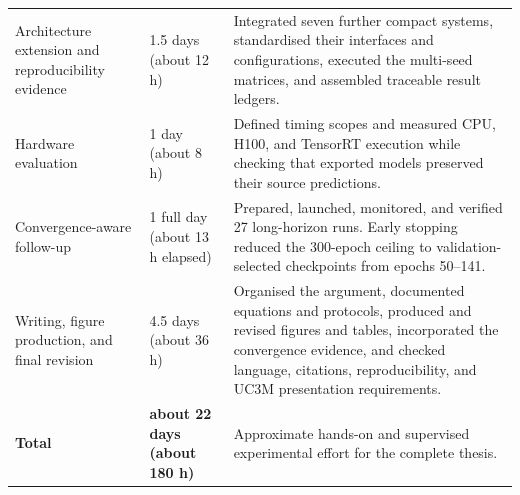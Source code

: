 \begin{longtable}{@{}p{}p{}p{}@{}}
Architecture extension and reproducibility evidence &
1.5 days (about 12 h) &
Integrated seven further compact systems, standardised their interfaces and
configurations, executed the multi-seed matrices, and assembled traceable
result ledgers. \\

Hardware evaluation &
1 day (about 8 h) &
Defined timing scopes and measured CPU, H100, and TensorRT execution while
checking that exported models preserved their source predictions. \\

Convergence-aware follow-up &
1 full day (about 13 h elapsed) &
Prepared, launched, monitored, and verified 27 long-horizon runs. Early
stopping reduced the 300-epoch ceiling to validation-selected checkpoints from
epochs 50--141. \\

Writing, figure production, and final revision &
4.5 days (about 36 h) &
Organised the argument, documented equations and protocols, produced and
revised figures and tables, incorporated the convergence evidence, and checked
language, citations, reproducibility, and UC3M presentation requirements. \\
\midrule
\textbf{Total} & \textbf{about 22 days (about 180 h)} &
Approximate hands-on and supervised experimental effort for the complete
thesis. \\
\end{longtable}
\endgroup
